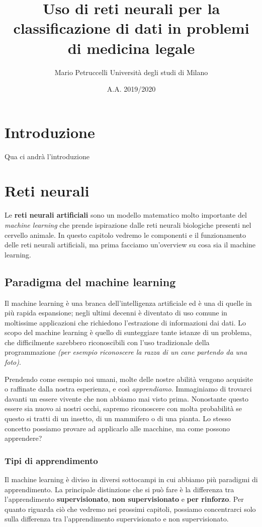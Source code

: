 \documentclass[12pt, twoside, letterpaper]{report}
\title{Uso di reti neurali per la classificazione di dati in problemi di medicina legale}
\author{Mario Petruccelli \cr Università degli studi di Milano}
\date{A.A. 2019/2020}
\begin{document}
	\begin{titlepage}
		
		\newpage
		\tableofcontents
		\thispagestyle{empty}
	\end{titlepage}

	\chapter*{Introduzione}     
		Qua ci andrà l'introduzione

		\newpage		
	\chapter{Reti neurali}
		Le \textbf{reti neurali artificiali} sono un modello matematico molto importante del \textit{machine learning} che prende ispirazione dalle reti neurali biologiche presenti nel cervello animale. In questo capitolo vedremo le componenti e il funzionamento delle reti neurali artificiali, ma prima facciamo un'overview su cosa sia il machine learning.

		\section{Paradigma del machine learning}
			Il machine learning è una branca dell'intelligenza artificiale ed è una di quelle in più rapida espansione; negli ultimi decenni è diventato di uso comune in moltissime applicazioni che richiedono l'estrazione di informazioni dai dati. Lo scopo del machine learning è quello di sunteggiare tante istanze di un problema, che difficilmente sarebbero riconoscibili con l'uso tradizionale della programmazione \textit{(per esempio riconoscere la razza di un cane partendo da una foto)}.   
			
			Prendendo come esempio noi umani, molte delle nostre abilità vengono acquisite o raffinate dalla nostra esperienza, e così \textit{apprendiamo}. Immaginiamo di trovarci davanti un essere vivente che non abbiamo mai visto prima. Nonostante questo essere sia nuovo ai nostri occhi, sapremo riconoscere con molta probabilità se questo si tratti di un insetto, di un mammifero o di una pianta. Lo stesso concetto possiamo provare ad applicarlo alle macchine, ma come possono apprendere? 
			
			\subsection{Tipi di apprendimento} Il machine learning è diviso in diversi sottocampi in cui abbiamo più paradigmi di apprendimento. La principale distinzione che si può fare è la differenza tra l'apprendimento \textbf{supervisionato}, \textbf{non supervisionato} e \textbf{per rinforzo}. Per quanto riguarda ciò che vedremo nei prossimi capitoli, possiamo concentrarci solo sulla differenza tra l'apprendimento supervisionato e non supervisionato.
			
\end{document}
